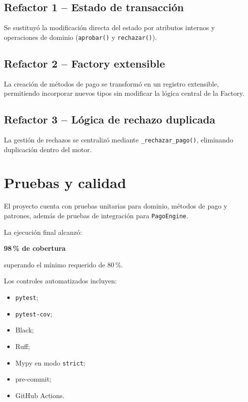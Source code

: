 \documentclass[11pt,a4paper]{article}
\begin{document}
\subsection{Refactor 1 -- Estado de transacción}

Se sustituyó la modificación directa del estado por atributos
internos y operaciones de dominio
(\texttt{aprobar()} y \texttt{rechazar()}).

\subsection{Refactor 2 -- Factory extensible}

La creación de métodos de pago se transformó en un registro
extensible, permitiendo incorporar nuevos tipos sin modificar
la lógica central de la Factory.

\subsection{Refactor 3 -- Lógica de rechazo duplicada}

La gestión de rechazos se centralizó mediante
\texttt{\_rechazar\_pago()}, eliminando duplicación dentro del
motor.

\section{Pruebas y calidad}

El proyecto cuenta con pruebas unitarias para dominio, métodos
de pago y patrones, además de pruebas de integración para
\texttt{PagoEngine}.

La ejecución final alcanzó:

\begin{center}
    {\Large\bfseries 98\,\% de cobertura}
\end{center}

superando el mínimo requerido de 80\,\%.

Los controles automatizados incluyen:

\begin{itemize}
    \item \texttt{pytest};
    \item \texttt{pytest-cov};
    \item Black;
    \item Ruff;
    \item Mypy en modo \texttt{strict};
    \item pre-commit;
    \item GitHub Actions.
\end{itemize}
\end{document}
